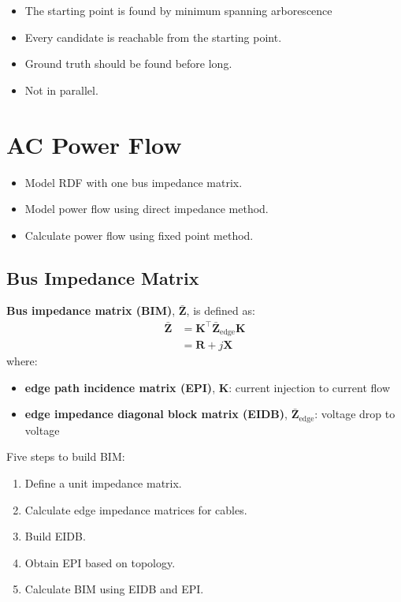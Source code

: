 \documentclass[
]{book}
\providecommand{\tightlist}{%
  \setlength{\itemsep}{0pt}\setlength{\parskip}{0pt}}
\begin{document}
\begin{itemize}
\tightlist
\item
  The starting point is found by minimum spanning arborescence
\item
  Every candidate is reachable from the starting point.
\item
  Ground truth should be found before long.
\item
  Not in parallel.
\end{itemize}

\hypertarget{AC}{%
\chapter{AC Power Flow}\label{AC}}

\begin{itemize}
\tightlist
\item
  Model RDF with one bus impedance matrix.
\item
  Model power flow using direct impedance method.
\item
  Calculate power flow using fixed point method.
\end{itemize}

\hypertarget{BIM}{%
\section{Bus Impedance Matrix}\label{BIM}}

\textbf{Bus impedance matrix (BIM)}, \(\boldsymbol{\bar{Z}}\), is defined as:
\[ \begin{aligned}
  \boldsymbol{\bar{Z}}
    &= \boldsymbol{K}^{\top} \boldsymbol{\bar{Z}}_\text{edge}
    \boldsymbol{K} \\
    &= \boldsymbol{R} + j \boldsymbol{X}
\end{aligned} \]
where:

\begin{itemize}
\tightlist
\item
  \textbf{edge path incidence matrix (EPI)}, \(\boldsymbol{K}\): current injection to
  current flow
\item
  \textbf{edge impedance diagonal block matrix (EIDB)},
  \(\boldsymbol{\bar{Z}}_\text{edge}\): voltage drop to voltage
\end{itemize}

Five steps to build BIM:

\begin{enumerate}
\def\labelenumi{\arabic{enumi}.}
\tightlist
\item
  Define a unit impedance matrix.
\item
  Calculate edge impedance matrices for cables.
\item
  Build EIDB.
\item
  Obtain EPI based on topology.
\item
  Calculate BIM using EIDB and EPI.
\end{enumerate}
\end{document}
